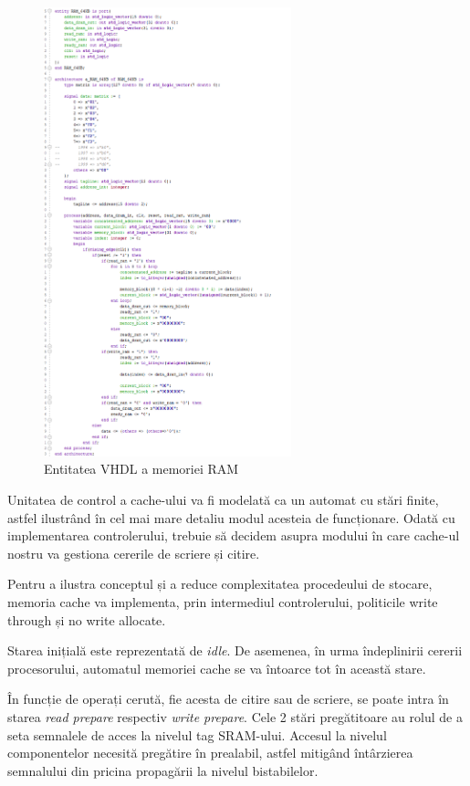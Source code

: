 \documentclass[12pt]{article}
\begin{document}
  \begin{figure}[h!]
 \includegraphics[width=0.64\textwidth]{ram64kb.png}
 \centering
 \caption{Entitatea VHDL a memoriei RAM}
 \label{Figura:59}
 \end{figure}

Unitatea de control a cache-ului va fi modelată ca un automat cu stări finite, astfel ilustrând în cel mai mare detaliu modul acesteia de funcționare. Odată cu implementarea controlerului, trebuie să decidem asupra modului în care cache-ul nostru va gestiona cererile de scriere și citire.

 Pentru a ilustra conceptul și a reduce complexitatea procedeului de stocare, memoria cache va implementa, prin intermediul controlerului, politicile write through și no write allocate.

Starea inițială este reprezentată de \textit{idle}. De asemenea, în urma îndeplinirii cererii procesorului, automatul memoriei cache se va întoarce tot în această stare.

În funcție de operați cerută, fie acesta de citire sau de scriere, se poate intra în starea \textit{read prepare} respectiv \textit{write prepare}. Cele 2 stări pregătitoare au rolul de a seta semnalele de acces la nivelul tag SRAM-ului. Accesul la nivelul componentelor necesită pregătire în prealabil, astfel mitigând întârzierea semnalului din pricina propagării la nivelul bistabilelor.
\end{document}
